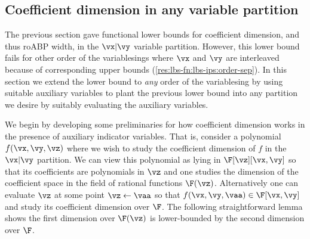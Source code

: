 \documentclass{toc}
\begin{document}
\subsection{Coefficient dimension in any variable partition}\label{sec:lbs-fn:every-partition}

The previous section gave functional lower bounds for coefficient dimension, and thus roABP width, in the $\vx|\vy$ variable partition. However, this lower bound fails for other order of the variablesings where $\vx$ and $\vy$ are interleaved because of corresponding upper bounds (\autoref{res:lbs-fn:lbs-ips:order-sep}). In this section we extend the lower bound to \emph{any} order of the variablesing by using suitable auxiliary variables to plant the previous lower bound into any partition we desire by suitably evaluating the auxiliary variables.

We begin by developing some preliminaries for how coefficient dimension works in the presence of auxiliary indicator variables.  That is, consider a polynomial $f(\vx,\vy,\vz)$ where we wish to study the coefficient dimension of $f$ in the $\vx|\vy$ partition. We can view this polynomial as lying in $\F[\vz][\vx,\vy]$ so that its coefficients are polynomials in $\vz$ and one studies the dimension of the coefficient space in the field of rational functions $\F(\vz)$.  Alternatively one can evaluate $\vz$ at some point $\vz\leftarrow\vaa$ so that $f(\vx,\vy,\vaa)\in\F[\vx,\vy]$ and study its coefficient dimension over $\F$.  The following straightforward lemma shows the first dimension over $\F(\vz)$ is lower-bounded by the second dimension over $\F$.
\end{document}
